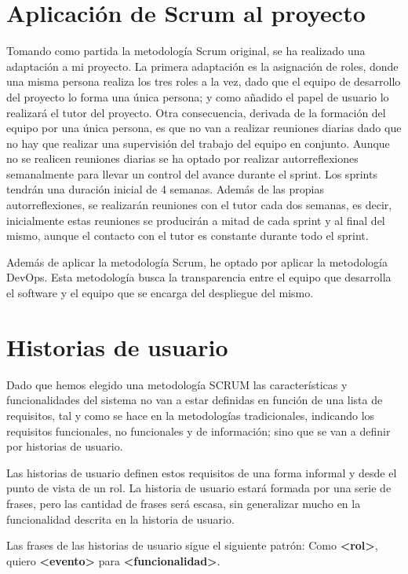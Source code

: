 \section{Aplicación de Scrum al proyecto}

Tomando como partida la metodología Scrum original, se ha realizado una adaptación a mi proyecto. La primera adaptación es la asignación de roles, donde una misma persona realiza los tres roles a la vez, dado que el equipo de desarrollo del proyecto lo forma una única persona; y como añadido el papel de usuario lo realizará el tutor del proyecto. Otra consecuencia, derivada de la formación del equipo por una única persona, es que no van a realizar reuniones diarias dado que no hay que realizar una supervisión del trabajo del equipo en conjunto. Aunque no se realicen reuniones diarias se ha optado por realizar autorreflexiones semanalmente para llevar un control del avance durante el sprint. Los sprints tendrán una duración inicial de 4 semanas. Además de las propias autorreflexiones, se realizarán reuniones con el tutor cada dos semanas, es decir, inicialmente estas reuniones se producirán a mitad de cada sprint y al final del mismo, aunque el contacto con el tutor es constante durante todo el sprint.

Además de aplicar la metodología Scrum, he optado por aplicar la metodología DevOps. Esta metodología busca la transparencia entre el equipo que desarrolla el software y el equipo que se encarga del despliegue del mismo.



\section{Historias de usuario}

Dado que hemos elegido una metodología SCRUM las características y funcionalidades del sistema no van a estar definidas en función de una lista de requisitos, tal y como se hace en la metodologías tradicionales, indicando los requisitos funcionales, no funcionales y de información; sino que se van a definir por historias de usuario.

Las historias de usuario definen estos requisitos de una forma informal y desde el punto de vista de un rol. La historia de usuario estará formada por una serie de frases, pero las cantidad de frases será escasa, sin generalizar mucho en la funcionalidad descrita en la historia de usuario.

Las frases de las historias de usuario sigue el siguiente patrón: Como \textbf{<rol>}, quiero \textbf{<evento>} para \textbf{<funcionalidad>}.

